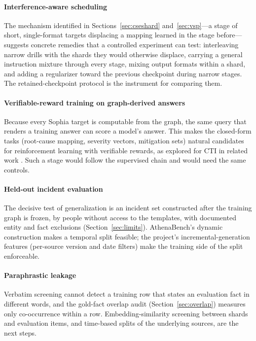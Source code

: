 \documentclass[twocolumn]{svjour3}
\begin{document}
\paragraph{Interference-aware scheduling}
The mechanism identified in Sections~\ref{sec:cseshard} and~\ref{sec:vsp}---a stage of short, single-format targets displacing a mapping learned in the stage before---suggests concrete remedies that a controlled experiment can test: interleaving narrow drills with the shards they would otherwise displace, carrying a general instruction mixture through every stage, mixing output formats within a shard, and adding a regularizer toward the previous checkpoint during narrow stages. The retained-checkpoint protocol is the instrument for comparing them.

\paragraph{Verifiable-reward training on graph-derived answers}
Because every Sophia target is computable from the graph, the same query that renders a training answer can score a model's answer. This makes the closed-form tasks (root-cause mapping, severity vectors, mitigation sets) natural candidates for reinforcement learning with verifiable rewards, as explored for CTI in related work \cite{alam2026minerva}. Such a stage would follow the supervised chain and would need the same controls.

\paragraph{Held-out incident evaluation}
The decisive test of generalization is an incident set constructed after the training graph is frozen, by people without access to the templates, with documented entity and fact exclusions (Section~\ref{sec:limits}). AthenaBench's dynamic construction makes a temporal split feasible; the project's incremental-generation features (per-source version and date filters) make the training side of the split enforceable.

\paragraph{Paraphrastic leakage}
Verbatim screening cannot detect a training row that states an evaluation fact in different words, and the gold-fact overlap audit (Section~\ref{sec:overlap}) measures only co-occurrence within a row. Embedding-similarity screening between shards and evaluation items, and time-based splits of the underlying sources, are the next steps.
\end{document}
